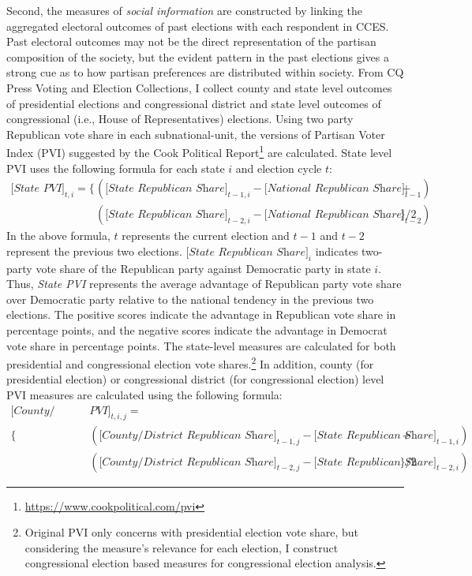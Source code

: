 \documentclass[doc,natbib,12pt]{apa6}\usepackage[]{graphicx}\usepackage[]{color}
\begin{document}
    \par Second, the measures of \textit{social information} are constructed by linking the aggregated electoral outcomes of past elections with each respondent in CCES. Past electoral outcomes may not be the direct representation of the partisan composition of the society, but the evident pattern in the past elections gives a strong cue as to how partisan preferences are distributed within society. From CQ Press Voting and Election Collections, I collect county and state level outcomes of presidential elections and congressional district and state level outcomes of congressional (i.e., House of Representatives) elections. Using two party Republican vote share in each subnational-unit, the versions of Partisan Voter Index (PVI) suggested by the Cook Political Report\footnote{\url{https://www.cookpolitical.com/pvi}} are calculated. State level PVI uses the following formula for each state $i$ and election cycle $t$: 
    \begin{align*}
    \textit{[State PVI]}_{t,i} = \{ & (\textit{[State Republican Share]}_{t-1, i} - \textit{[National Republican Share]}_{t-1}) + \\  
    &(\textit{[State Republican Share]}_{t-2, i} - \textit{[National Republican Share]}_{t-2}) \}/2
    \end{align*}    
    \noindent In the above formula, $t$ represents the current election and $t-1$ and $t-2$ represent the previous two elections. $\textit{[State Republican Share]}_i$ indicates two-party vote share of the Republican party against Democratic party in state $i$. Thus, \textit{State PVI} represents the average advantage of Republican party vote share over Democratic party relative to the national tendency in the previous two elections. The positive scores indicate the advantage in Republican vote share in percentage points, and the negative scores indicate the advantage in Democrat vote share in percentage points. The state-level measures are calculated for both presidential and congressional election vote shares.\footnote{Original PVI only concerns with presidential election vote share, but considering the measure's relevance for each election, I construct congressional election based measures for congressional election analysis.} In addition, county (for presidential election) or congressional district (for congressional election) level PVI measures are calculated using the following formula:
    \begin{align*}
        \textit{[County/District }&\textit{PVI]}_{t,i,j} = \\
        \{ &(\textit{[County/District Republican Share]}_{t-1, j} - \textit{[State Republican Share]}_{t-1,i}) + \\  
        &(\textit{[County/District Republican Share]}_{t-2, j} - \textit{[State Republican Share]}_{t-2, i}) \}/2
    \end{align*}    
\end{document}

